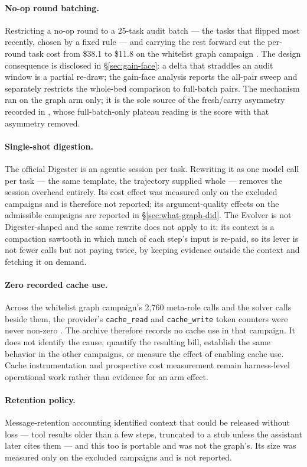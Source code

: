 \paragraph{No-op round batching.} Restricting a no-op round to a 25-task
audit batch --- the tasks that flipped most recently, chosen by a fixed
rule --- and carrying the rest forward cut the per-round task cost from
\$38.1 to \$11.8 on the whitelist graph campaign . The design
consequence is disclosed in \S\ref{sec:gain-face}: a delta that straddles
an audit window is a partial re-draw; the gain-face analysis reports the
all-pair sweep and separately restricts the whole-bed comparison to
full-batch pairs. The mechanism ran on the graph arm only; it is the sole
source of the fresh/carry asymmetry recorded in , whose full-batch-only
plateau reading is the score with that asymmetry removed.

\paragraph{Single-shot digestion.} The official Digester is an agentic
session per task. Rewriting it as one model call per task --- the same
template, the trajectory supplied whole --- removes the session overhead
entirely. Its cost effect was measured only on the excluded campaigns and
is therefore not reported; its argument-quality effects on the admissible
campaigns are reported in \S\ref{sec:what-graph-did}. The Evolver is not
Digester-shaped and the same rewrite does not apply to it: its context is
a compaction sawtooth in which much of each step's input is re-paid, so
its lever is not fewer calls but not paying twice, by keeping evidence
outside the context and fetching it on demand.

\paragraph{Zero recorded cache use.} Across the whitelist graph campaign's
2{,}760 meta-role calls and the solver calls beside them, the provider's
\texttt{cache\_read} and \texttt{cache\_write} token counters were never
non-zero . The archive therefore records no cache use in that
campaign. It does not identify the cause, quantify the resulting bill,
establish the same behavior in the other campaigns, or measure the effect
of enabling cache use. Cache instrumentation and prospective cost
measurement remain harness-level operational work rather than evidence for
an arm effect.

\paragraph{Retention policy.} Message-retention accounting identified
context that could be released without loss --- tool results older than a
few steps, truncated to a stub unless the assistant later cites them ---
and this too is portable and was not the graph's. Its size was measured
only on the excluded campaigns and is not reported.
